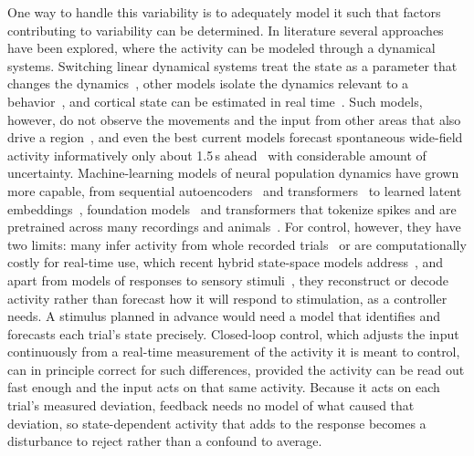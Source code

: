 One way to handle this variability is to adequately model it such that factors contributing to variability can be determined. In literature several approaches have been explored, where the activity can be modeled through a dynamical systems.
Switching linear dynamical systems treat the state as a parameter that changes the dynamics~\citep{linderman2017rslds}, other models isolate the dynamics relevant to a behavior~\citep{sani2021modeling}, and cortical state can be estimated in real time~\citep{weiss2024realtime}.
Such models, however, do not observe the movements and the input from other areas that also drive a region~\citep{musall2019single, stringer2019spontaneous, zagha2013motor}, and even the best current models forecast spontaneous wide-field activity informatively only about 1.5\,s ahead~\citep{lu2025benchmarking} with considerable amount of uncertainty.
Machine-learning models of neural population dynamics have grown more capable, from sequential autoencoders~\citep{pandarinath2018lfads} and transformers~\citep{ye2021ndt} to learned latent embeddings~\citep{schneider2023cebra}, foundation models~\citep{wang2025foundation} and transformers that tokenize spikes and are pretrained across many recordings and animals~\citep{azabou2023poyo}.
For control, however, they have two limits: many infer activity from whole recorded trials~\citep{pandarinath2018lfads} or are computationally costly for real-time use, which recent hybrid state-space models address~\citep{ryoo2025possm}, and apart from models of responses to sensory stimuli~\citep{wang2025foundation}, they reconstruct or decode activity rather than forecast how it will respond to stimulation, as a controller needs.
A stimulus planned in advance would need a model that identifies and forecasts each trial's state precisely.
Closed-loop control, which adjusts the input continuously from a real-time measurement of the activity it is meant to control, can in principle correct for such differences, provided the activity can be read out fast enough and the input acts on that same activity.
Because it acts on each trial's measured deviation, feedback needs no model of what caused that deviation, so state-dependent activity that adds to the response becomes a disturbance to reject rather than a confound to average.

